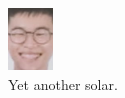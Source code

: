 \documentclass{article}
\begin{document}
\begin{figure}[h!]
\begin{subfigure}[b]{0.3\linewidth}
\includegraphics[width=\linewidth]{assets/solar.png}
\caption{Yet another solar.}
\end{subfigure}
\begin{subfigure}[b]{0.5\linewidth}

\end{subfigure}
\end{figure}
\end{document}
